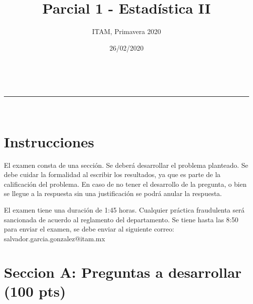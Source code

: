 \documentclass[addpoints]{exam}
\makeatletter
\newcommand{\linia}{\rule{\linewidth}{0.5pt}}
\theoremstyle{mytheor}
\renewcommand{\maketitle}{
    \begin{center}
    \vspace{2ex}
    {\huge \textsc{\@title}}
    \vspace{1ex}
    \\
    \linia\\
    \@author \hfill \@date
    \vspace{4ex}
    \end{center}
  }
\makeatother
\begin{document}
  
  \title{Parcial 1 - Estadística II}
  
  \author{ITAM, Primavera 2020}
  
  \date{26/02/2020}
  
  \maketitle
  
  \section*{Instrucciones}
  
 El examen consta de una sección. Se deberá desarrollar el problema planteado. Se debe cuidar la formalidad al escribir los resultados, ya que es parte de la calificación del problema. En caso de no tener el desarrollo de la pregunta, o bien se llegue a la respuesta sin una justificación se podrá anular la respuesta. 
  
  \vspace{10pt}
  
El examen tiene una duración de 1:45 horas. Cualquier práctica fraudulenta será sancionada de acuerdo al reglamento del departamento. Se tiene hasta las 8:50 para enviar el examen, se debe enviar al siguiente correo: salvador.garcia.gonzalez@itam.mx


  \section*{Seccion A: Preguntas a desarrollar (100 pts)}
  
\end{document}
